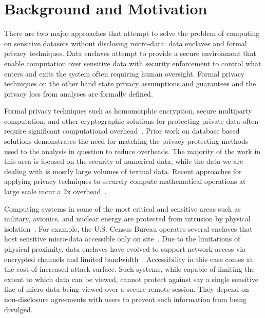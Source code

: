 \section{Background and Motivation} \label{sec:background}

There are two major approaches that attempt to solve the problem of computing on sensitive
datasets without disclosing micro-data: data enclaves and formal privacy techniques. Data enclaves attempt to
provide a secure environment that enable computation over sensitive data with security enforcement
to control what enters and exits the system often requiring human oversight. Formal privacy
techniques on the other hand state privacy assumptions and guarantees and the privacy loss
from analyses are formally defined.

Formal privacy techniques such as homomorphic encryption, secure multiparty computation, and
other cryptographic solutions for protecting private data often require significant computational
overhead~\cite{naehrig2011can}. Prior work on database based solutions \cite{popa2011cryptdb}
demonstrates the need for matching the privacy protecting methods used to the analysis in question
to reduce overheads. The majority of the work in this area is focused on the security of
numerical data, while the data we are dealing with is mostly large volumes of textual data.
Recent approaches for applying privacy techniques to securely compute
mathematical operations at large scale incur a 2x overhead~\cite{kepner2014computing}.

Computing systems in some of the most critical and sensitive areas such as military, avionics,
and nuclear energy are protected from intrusion by physical isolation~\cite{byres2013air, ross2013security}.
For example, the U.S. Census Bureau operates several enclaves that host sensitive micro-data accessible
only on site~\cite{rdc_uscensus}. Due to the limitations of physical proximity, data enclaves
have evolved to support network access via encrypted channels and limited bandwidth~\cite{lane2008using, grossman2016toward}.
Accessibility in this case comes at the cost of increased attack surface. Such systems, while
capable of limiting the extent to which data can be viewed, cannot protect against say a single
sensitive line of micro-data being viewed over a secure remote session. They depend on non-disclosure
agreements with users to prevent such information from being divulged.

